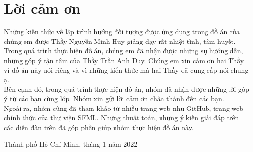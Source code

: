 \section*{Lời cảm ơn}
Những kiến thức về lập trình hướng đối tượng được ứng dụng trong đồ án của chúng em được Thầy Nguyễn Minh Huy giảng dạy rất nhiệt tình, tâm huyết. Trong quá trình thực hiện đồ án, chúng em đã nhận được những sự hướng dẫn, những góp ý tận tâm của Thầy Trần Anh Duy. Chúng em xin cảm ơn hai Thầy vì đồ án này nói riêng và vì những kiến thức mà hai Thầy đã cung cấp nói chung ạ.\\
Bên cạnh đó, trong quá trình thực hiện đồ án, nhóm đã nhận được những lời góp ý từ các bạn cùng lớp. Nhóm xin gửi lời cảm ơn chân thành đến các bạn.\\
Ngoài ra, nhóm cũng đã tham khảo từ nhiều trang web như GitHub, trang web chính thức của thư viện SFML. Những thuật toán, những ý kiến giải đáp trên các diễn đàn trên đã góp phần giúp nhóm thực hiện đồ án này. 
\begin{flushright}
Thành phố Hồ Chí Minh, tháng 1 năm 2022
\end{flushright}